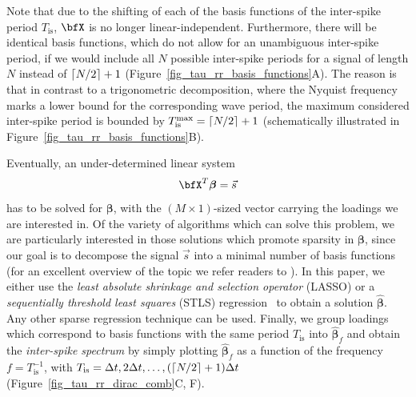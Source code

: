\documentclass[entropy,article,accept,pdftex,moreauthors]{Definitions/mdpi}
\DeclarePairedDelimiter\ceil{\lceil}{\rceil}
\begin{document}
Note that due to the shifting of each of the basis functions of the inter-spike period $T_\text{is}$, $\bfX$ is no longer linear-independent. 
Furthermore, there will be identical basis functions, which do not allow for an unambiguous inter-spike period, 
if we would include all $N$ possible inter-spike periods for a signal of length $N$ instead of $\ceil*{N/2}+1$ (Figure~\ref{fig_tau_rr_basis_functions}A).
The reason is that in contrast to a trigonometric decomposition, where the Nyquist frequency marks a lower bound for the corresponding wave period, 
the maximum considered inter-spike period is bounded by $T_{\text{is}}^{\text{max}} = \ceil*{N/2}+1$ (schematically illustrated in 
Figure~\ref{fig_tau_rr_basis_functions}B). 

Eventually, an under-determined linear system
\begin{equation}
\bfX^T \boldsymbol{\beta}=\vec{s}
\label{eq_linear_system}
\end{equation}  
has to be solved for $\boldsymbol\beta$, with the $(M\times 1)$-sized vector carrying the loadings we are interested in. Of the variety of algorithms which can solve this problem, we are 
particularly interested in those solutions which promote sparsity in $\boldsymbol\beta$, since our goal is to decompose the signal $\vec{s}$ into a minimal number of basis 
functions (for an excellent overview of the topic we refer readers to \citet{Brunton2019}). In this paper, we either use the \textit{least absolute shrinkage and selection operator} 
(LASSO) \cite{Tibshirani1996} or a \textit{sequentially threshold least squares} (STLS) regression~\cite{Brunton2016,Brunton2019} to obtain a solution $\hat{\boldsymbol\beta}$. Any other 
sparse regression technique can be used. Finally, we group loadings 
which correspond to basis functions with the same period 
$T_\text{is}$ into $\hat{\boldsymbol\beta}_f$ and obtain the 
\textit{inter-spike spectrum} by simply plotting $\hat{\boldsymbol\beta}_f$ as a function of the frequency $f=T_\text{is}^{-1}$, with $T_\text{is}=\Delta t, 2\Delta t, \dots, (\ceil*{N/2}+1) \Delta t$ 
(Figure~\ref{fig_tau_rr_dirac_comb}C, F).
\end{document}

